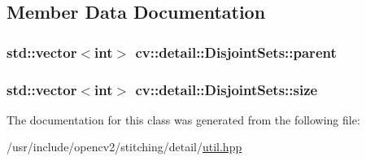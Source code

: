\subsection{Member Data Documentation}
\hypertarget{classcv_1_1detail_1_1DisjointSets_a1663942a3058de8c0835cdc657fd3591}{
\subsubsection[{parent}]{\setlength{\rightskip}{0pt plus 5cm}std\-::vector$<$int$>$ cv\-::detail\-::\-Disjoint\-Sets\-::parent}}\label{classcv_1_1detail_1_1DisjointSets_a1663942a3058de8c0835cdc657fd3591}
\hypertarget{classcv_1_1detail_1_1DisjointSets_a57434b53bae97ab6bedbb134acadc22b}{
\subsubsection[{size}]{\setlength{\rightskip}{0pt plus 5cm}std\-::vector$<$int$>$ cv\-::detail\-::\-Disjoint\-Sets\-::size}}\label{classcv_1_1detail_1_1DisjointSets_a57434b53bae97ab6bedbb134acadc22b}


The documentation for this class was generated from the following file\-:\begin{DoxyCompactItemize}
\item 
/usr/include/opencv2/stitching/detail/\hyperlink{util_8hpp}{util.\-hpp}\end{DoxyCompactItemize}
